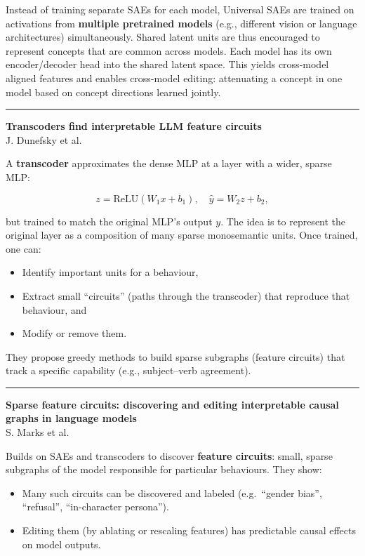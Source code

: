 \documentclass[a5paper]{article}
\providecommand{\tightlist}{%
  \setlength{\itemsep}{0pt}\setlength{\parskip}{0pt}}
\begin{document}
Instead of training separate SAEs for each model, Universal SAEs are
trained on activations from \textbf{multiple pretrained models} (e.g.,
different vision or language architectures) simultaneously. Shared
latent units are thus encouraged to represent concepts that are common
across models. Each model has its own encoder/decoder head into the
shared latent space. This yields cross-model aligned features and
enables cross-model editing: attenuating a concept in one model based on
concept directions learned jointly.

\begin{center}\rule{0.5\linewidth}{0.5pt}\end{center}

\textbf{Transcoders find interpretable LLM feature circuits}\\
J. Dunefsky et al.

A \textbf{transcoder} approximates the dense MLP at a layer with a
wider, sparse MLP:

\[ z = \mathrm{ReLU}(W_1 x + b_1),\quad \hat y = W_2 z + b_2, \]

but trained to match the original MLP's output $y$. The idea is to
represent the original layer as a composition of many sparse
monosemantic units. Once trained, one can:

\begin{itemize}
\tightlist
\item
  Identify important units for a behaviour,
\item
  Extract small ``circuits'' (paths through the transcoder) that
  reproduce that behaviour, and
\item
  Modify or remove them.
\end{itemize}

They propose greedy methods to build sparse subgraphs (feature circuits)
that track a specific capability (e.g., subject--verb agreement).

\begin{center}\rule{0.5\linewidth}{0.5pt}\end{center}

\textbf{Sparse feature circuits: discovering and editing interpretable
causal graphs in language models}\\
S. Marks et al.

Builds on SAEs and transcoders to discover \textbf{feature circuits}:
small, sparse subgraphs of the model responsible for particular
behaviours. They show:

\begin{itemize}
\tightlist
\item
  Many such circuits can be discovered and labeled (e.g.~``gender
  bias'', ``refusal'', ``in-character persona'').
\item
  Editing them (by ablating or rescaling features) has predictable
  causal effects on model outputs.
\end{itemize}
\end{document}
